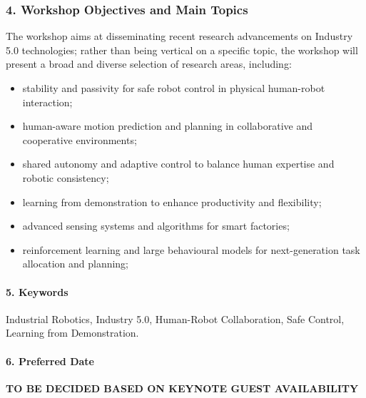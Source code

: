 \documentclass{article}
\begin{document}
\subsubsection*{4. Workshop Objectives and Main Topics}
The workshop aims at disseminating recent research advancements on Industry 5.0 technologies; 
rather than being vertical on a specific topic, the workshop will present a broad and diverse selection of research areas, including:
\begin{itemize}
    \item stability and passivity for safe robot control in physical human-robot interaction;
    \item human-aware motion prediction and planning in collaborative and cooperative environments;
    \item shared autonomy and adaptive control to balance human expertise and robotic consistency;
    \item learning from demonstration to enhance productivity and flexibility;
    \item advanced sensing systems and algorithms for smart factories;
    \item reinforcement learning and large behavioural models for next-generation task allocation and planning;
\end{itemize}


\paragraph{5. Keywords} 
Industrial Robotics, Industry 5.0, Human-Robot Collaboration, Safe Control, Learning from Demonstration.


\paragraph{6. Preferred Date} \textbf{TO BE DECIDED BASED ON KEYNOTE GUEST AVAILABILITY}
\end{document}

